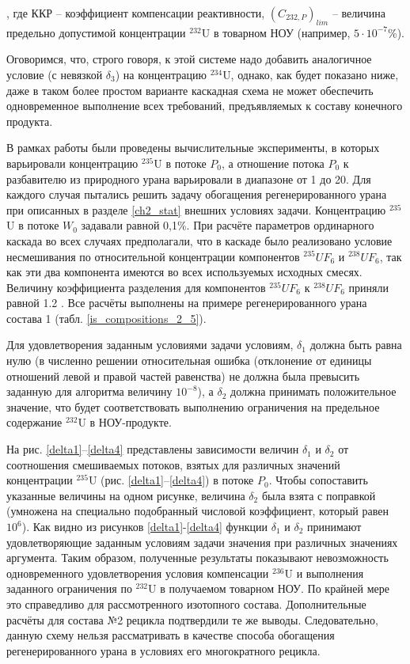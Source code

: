 , где ККР -- коэффициент компенсации реактивности, $(C_{232,P})_{lim}$ -- величина предельно допустимой концентрации $^{232}$U в товарном НОУ (например, $5\cdot10^{-7}$\%).

Оговоримся, что, строго говоря, к этой системе надо добавить аналогичное условие (с невязкой $\delta_3$) на концентрацию $^{234}$U, однако, как будет показано ниже, даже в таком более простом варианте каскадная схема не может обеспечить одновременное выполнение всех требований, предъявляемых к составу конечного продукта.

В рамках работы были проведены вычислительные эксперименты, в которых варьировали концентрацию $^{235}$U в потоке $P_0$, а отношение потока $P_0$ к разбавителю из природного урана варьировали в диапазоне от 1 до 20. Для каждого случая пытались решить задачу обогащения регенерированного урана при описанных в разделе \ref{ch2_stat} внешних условиях задачи. Концентрацию $^{235}$U в потоке $W_0$ задавали равной 0,1\%. При расчёте параметров ординарного каскада во всех случаях предполагали, что в каскаде было реализовано условие несмешивания по относительной концентрации компонентов $^{235}UF_6$ и $^{238}UF_6$, так как эти два компонента имеются во всех используемых исходных смесях. Величину коэффициента разделения для компонентов  $^{235}UF_6$ к $^{238}UF_6$ приняли равной 1.2 \cite{smirnovEvolutionIsotopicComposition2012}. Все расчёты выполнены на примере регенерированного урана состава 1 (табл. \ref{is_compositions_2_5}).

Для удовлетворения заданным условиями задачи условиям, $\delta_1$ должна быть равна нулю (в численно решении относительная ошибка (отклонение от единицы отношений левой и правой частей равенства) не должна была превысить заданную для алгоритма величину $10^{-8}$), а $\delta_2$ должна принимать положительное значение, что будет соответствовать выполнению ограничения на предельное содержание $^{232}$U в НОУ-продукте.

На рис. \ref{delta1}--\ref{delta4} представлены зависимости величин $\delta_1$ и $\delta_2$ от соотношения смешиваемых потоков, взятых для различных значений концентрации $^{235}$U (рис. \ref{delta1}--\ref{delta4}) в потоке $P_0$. Чтобы сопоставить указанные величины на одном рисунке, величина $\delta_2$ была взята с поправкой (умножена на специально подобранный числовой коэффициент, который равен $10^{6}$).
Как видно из рисунков \ref{delta1}-\ref{delta4} функции $\delta_1$ и $\delta_2$ принимают удовлетворяющие заданным условиям задачи значения при различных значениях аргумента. Таким образом, полученные результаты показывают невозможность одновременного удовлетворения условия компенсации $^{236}$U и выполнения заданного ограничения по $^{232}$U в получаемом товарном НОУ. По крайней мере это справедливо для рассмотренного изотопного состава. Дополнительные расчёты для состава №2 рецикла подтвердили те же выводы. Следовательно, данную схему нельзя рассматривать в качестве способа обогащения регенерированного урана в условиях его многократного рецикла.


